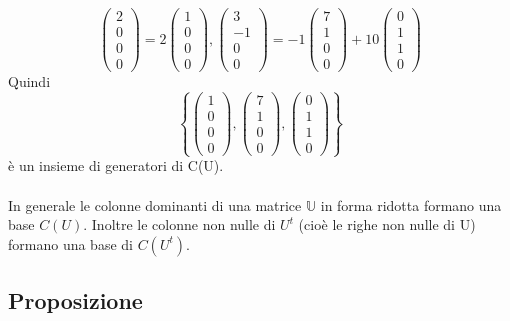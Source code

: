 \documentclass[12pt]{article}
\begin{document}
\[\begin{pmatrix}
    2\\
    0\\
    0\\
    0
\end{pmatrix} = 2 \begin{pmatrix}
    1\\
    0\\
    0\\
    0
\end{pmatrix}, \begin{pmatrix}
    3\\
    -1\\
    0\\
    0
\end{pmatrix} = -1 \begin{pmatrix}
    7\\
    1\\
    0\\
    0
\end{pmatrix} + 10 \begin{pmatrix}
    0\\
    1\\
    1\\
    0
\end{pmatrix}\]
Quindi
\[\left\{ \begin{pmatrix}
    1\\
    0\\
    0\\
    0
\end{pmatrix}, \begin{pmatrix}
    7\\
    1\\
    0\\
    0
\end{pmatrix}, \begin{pmatrix}
    0\\
    1\\
    1\\
    0
\end{pmatrix}\right\}\]
è un insieme di generatori di C(U).
\\\\
In generale le colonne dominanti di una matrice $\mathbb{U}$ in forma ridotta formano una base $C(U)$. Inoltre le colonne non nulle di $U^t$ (cioè le righe non nulle di U) formano una base di $C(U^t)$.

\subsection{Proposizione}
\end{document}
